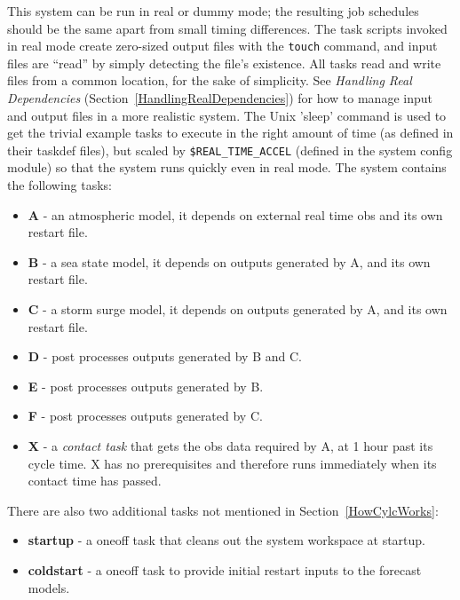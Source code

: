 

This system can be run in real or dummy mode; the resulting job 
schedules should be the same apart from small timing differences.
The task scripts invoked in real mode create zero-sized output files
with the \lstinline=touch= command, and input files are ``read'' by
simply detecting the file's existence.  All tasks read and write files
from a common location, for the sake of simplicity. 
See {\em Handling Real Dependencies}
(Section~\ref{HandlingRealDependencies}) for how to manage input and
output files in a more realistic system. 
The Unix 'sleep' command is used to get the trivial example tasks to
execute in the right amount of time (as defined in their taskdef files),
but scaled by \lstinline=$REAL_TIME_ACCEL= 
(defined in the system config module)
so that the system runs quickly even in real mode.
The system contains the following tasks:

\begin{itemize}
    \item {\bf A} - an atmospheric model, it depends on external real
        time obs and its own restart file.
    \item {\bf B} - a sea state model, it depends on outputs generated
        by A, and its own restart file.
    \item {\bf C} - a storm surge model, it depends on outputs generated
        by A, and its own restart file.
    \item {\bf D} - post processes outputs generated by B and C.
    \item {\bf E} - post processes outputs generated by B.
    \item {\bf F} - post processes outputs generated by C.
    \item {\bf X} - a {\em contact task} that gets the obs data required
    by A, at 1 hour past its cycle time. X has no prerequisites and
    therefore runs immediately when its contact time has passed.
\end{itemize}

There are also two additional tasks not mentioned in Section~\ref{HowCylcWorks}:

\begin{itemize}
    \item {\bf startup} - a oneoff task that cleans out the system
    workspace at startup.
    \item {\bf coldstart} - a oneoff task to provide initial restart
        inputs to the forecast models. 
\end{itemize}

